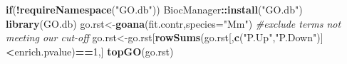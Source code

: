 \documentclass[]{book}
\newenvironment{Shaded}{\begin{snugshade}}{\end{snugshade}}
\newcommand{\CommentTok}[1]{\textcolor[rgb]{0.56,0.35,0.01}{\textit{#1}}}
\newcommand{\ControlFlowTok}[1]{\textcolor[rgb]{0.13,0.29,0.53}{\textbf{#1}}}
\newcommand{\DataTypeTok}[1]{\textcolor[rgb]{0.13,0.29,0.53}{#1}}
\newcommand{\DecValTok}[1]{\textcolor[rgb]{0.00,0.00,0.81}{#1}}
\newcommand{\KeywordTok}[1]{\textcolor[rgb]{0.13,0.29,0.53}{\textbf{#1}}}
\newcommand{\NormalTok}[1]{#1}
\newcommand{\OperatorTok}[1]{\textcolor[rgb]{0.81,0.36,0.00}{\textbf{#1}}}
\newcommand{\StringTok}[1]{\textcolor[rgb]{0.31,0.60,0.02}{#1}}
\begin{document}
\begin{Shaded}
\begin{Highlighting}[]
\ControlFlowTok{if}\NormalTok{(}\OperatorTok{!}\KeywordTok{requireNamespace}\NormalTok{(}\StringTok{"GO.db"}\NormalTok{))}
\NormalTok{  BiocManager}\OperatorTok{::}\KeywordTok{install}\NormalTok{(}\StringTok{"GO.db"}\NormalTok{)}
\KeywordTok{library}\NormalTok{(GO.db)}
\NormalTok{go.rst<-}\KeywordTok{goana}\NormalTok{(fit.contr,}\DataTypeTok{species=}\StringTok{"Mm"}\NormalTok{)}
\CommentTok{#exclude terms not meeting our cut-off}
\NormalTok{go.rst<-go.rst[}\KeywordTok{rowSums}\NormalTok{(go.rst[,}\KeywordTok{c}\NormalTok{(}\StringTok{"P.Up"}\NormalTok{,}\StringTok{"P.Down"}\NormalTok{)]}\OperatorTok{<}\NormalTok{enrich.pvalue)}\OperatorTok{==}\DecValTok{1}\NormalTok{,]}
\KeywordTok{topGO}\NormalTok{(go.rst)}
\end{Highlighting}
\end{Shaded}
\end{document}
